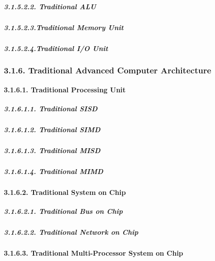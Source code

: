 \documentclass[
]{article}
\begin{document}
\hypertarget{traditional-alu-3}{%
\subparagraph{3.1.5.2.2. Traditional ALU}\label{traditional-alu-3}}

\hypertarget{traditional-memory-unit-3}{%
\subparagraph{3.1.5.2.3.Traditional Memory
Unit}\label{traditional-memory-unit-3}}

\hypertarget{traditional-io-unit-3}{%
\subparagraph{3.1.5.2.4.Traditional I/O
Unit}\label{traditional-io-unit-3}}

\hypertarget{traditional-advanced-computer-architecture-1}{%
\subsubsection{3.1.6. Traditional Advanced Computer
Architecture}\label{traditional-advanced-computer-architecture-1}}

\hypertarget{traditional-processing-unit-1}{%
\paragraph{3.1.6.1. Traditional Processing
Unit}\label{traditional-processing-unit-1}}

\hypertarget{traditional-sisd-1}{%
\subparagraph{3.1.6.1.1. Traditional SISD}\label{traditional-sisd-1}}

\hypertarget{traditional-simd-1}{%
\subparagraph{3.1.6.1.2. Traditional SIMD}\label{traditional-simd-1}}

\hypertarget{traditional-misd-1}{%
\subparagraph{3.1.6.1.3. Traditional MISD}\label{traditional-misd-1}}

\hypertarget{traditional-mimd-1}{%
\subparagraph{3.1.6.1.4. Traditional MIMD}\label{traditional-mimd-1}}

\hypertarget{traditional-system-on-chip-1}{%
\paragraph{3.1.6.2. Traditional System on
Chip}\label{traditional-system-on-chip-1}}

\hypertarget{traditional-bus-on-chip-1}{%
\subparagraph{3.1.6.2.1. Traditional Bus on
Chip}\label{traditional-bus-on-chip-1}}

\hypertarget{traditional-network-on-chip-1}{%
\subparagraph{3.1.6.2.2. Traditional Network on
Chip}\label{traditional-network-on-chip-1}}

\hypertarget{traditional-multi-processor-system-on-chip-1}{%
\paragraph{3.1.6.3. Traditional Multi-Processor System on
Chip}\label{traditional-multi-processor-system-on-chip-1}}
\end{document}
